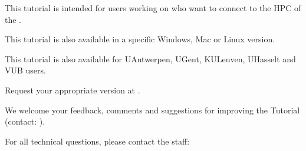 This tutorial \strong{(\version)} is intended for users working on \strong{\OS} who want to connect to the HPC of the \strong{\university}.

This tutorial is also available in a specific Windows, Mac or Linux version.

This tutorial is also available for UAntwerpen, UGent, KULeuven, UHasselt and VUB users.

Request your appropriate version at \hpcinfo.


We welcome your feedback, comments and suggestions for improving the \hpc
Tutorial  (contact: \hpcinfo).

For all technical questions, please contact the \hpc staff:


